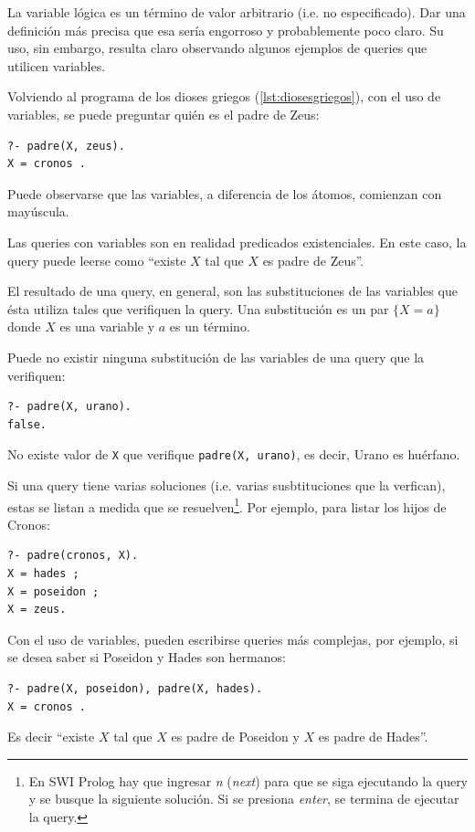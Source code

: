 \documentclass[12pt,titlepage]{article}
\begin{document}
La variable lógica es un término de valor arbitrario (i.e. no especificado). Dar una definición más precisa que esa sería engorroso y probablemente poco claro. Su uso, sin embargo, resulta claro observando algunos ejemplos de queries que utilicen variables.

Volviendo al programa de los dioses griegos (\ref{lst:diosesgriegos}), con el uso de variables, se puede preguntar quién es el padre de Zeus:
\begin{lstlisting}
?- padre(X, zeus).
X = cronos .
\end{lstlisting}

Puede observarse que las variables, a diferencia de los átomos, comienzan con mayúscula.

Las queries con variables son en realidad predicados existenciales. En este caso, la query puede leerse como ``existe $X$ tal que $X$ es padre de Zeus''. 

El resultado de una query, en general, son las substituciones de las variables que ésta utiliza tales que verifiquen la query. Una substitución es un par $\{X=a\}$ donde $X$ es una variable y $a$ es un término.

Puede no existir ninguna substitución de las variables de una query que la verifiquen:
\begin{lstlisting}
?- padre(X, urano).
false.
\end{lstlisting}

No existe valor de \lstinline|X| que verifique \lstinline|padre(X, urano)|, es decir, Urano es huérfano.

Si una query tiene varias soluciones (i.e. varias susbtituciones que la verfican), estas se listan a medida que se resuelven\footnote{En SWI Prolog hay que ingresar \emph{n} (\emph{next}) para que se siga ejecutando la query y se busque la siguiente solución. Si se presiona \emph{enter}, se termina de ejecutar la query.}. Por ejemplo, para listar los hijos de Cronos:
\begin{lstlisting}
?- padre(cronos, X).
X = hades ;
X = poseidon ;
X = zeus.
\end{lstlisting}

Con el uso de variables, pueden escribirse queries más complejas, por ejemplo, si se desea saber si Poseidon y Hades son hermanos:
\begin{lstlisting}
?- padre(X, poseidon), padre(X, hades).
X = cronos .
\end{lstlisting}

Es decir ``existe $X$ tal que $X$ es padre de Poseidon y $X$ es padre de Hades''.
\end{document}
